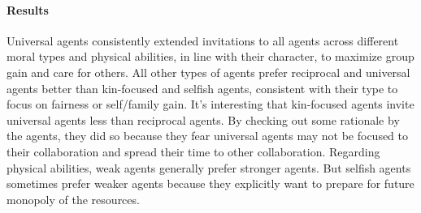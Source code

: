\paragraph{Results}
Universal agents consistently extended invitations to all agents across different moral types and physical abilities, in line with their character, to maximize group gain and care for others. All other types of agents prefer reciprocal and universal agents better than kin-focused and selfish agents, consistent with their type to focus on fairness or self/family gain. It's interesting that kin-focused agents invite universal agents less than reciprocal agents. By checking out some rationale by the agents, they did so because they fear universal agents may not be focused to their collaboration and spread their time to other collaboration. Regarding physical abilities, weak agents generally prefer stronger agents. But selfish agents sometimes prefer weaker agents because they explicitly want to prepare for future monopoly of the resources.




